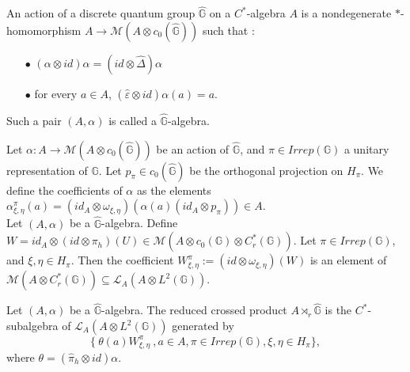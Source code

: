 

\begin{definition} An action of a discrete quantum group $\hat{\mathbb G}$ on a $C^*$-algebra $A$ is a nondegenerate $*$-homomorphism $A\rightarrow \mathcal M(A\otimes c_0(\hat{\mathbb G}))$ such that :
\begin{itemize}
\item[$\bullet$] $(\alpha \otimes id )\alpha = (id\otimes \hat\Delta) \alpha$
\item[$\bullet$] for every $a\in A$, $(\hat\varepsilon \otimes id)\alpha(a) = a$.
\end{itemize}
Such a pair $(A,\alpha)$ is called a $\hat{\mathbb G}$-algebra.
\end{definition}

Let $\alpha : A\rightarrow \mathcal M(A\otimes c_0(\hat{\mathbb G}))$ be an action of $\hat{\mathbb G}$, and $\pi\in Irrep(\mathbb G)$ a unitary representation of $\mathbb G$. Let $p_\pi\in c_0(\hat{\mathbb G}) $ be the orthogonal projection on $H_\pi$. We define the coefficients of $\alpha$ as the elements $\alpha^\pi_{\xi,\eta}(a) = ( id_A \otimes \omega_{\xi,\eta})(\alpha(a)( id _A\otimes p_\pi)) \in A$.\\  

Let $(A,\alpha)$ be a $\hat{\mathbb G}$-algebra. Define $W= id_A \otimes (id\otimes\pi_h)(U) \in \mathcal M (A\otimes c_0(\mathbb G)\otimes C^*_r(\mathbb G))  $. Let $\pi\in Irrep(\mathbb G)$, and $\xi,\eta \in H_\pi$. Then the coefficient $W^\pi_{\xi,\eta}:=(id\otimes \omega_{\xi,\eta})(W)$ is an element of $\mathcal M(A\otimes C_r^*(\mathbb G)) \subseteq \mathcal L_A(A\otimes L^2(\mathbb G))$. 

\begin{definition} Let $(A,\alpha)$ be a $\hat{\mathbb G}$-algebra. The reduced crossed product $A\rtimes_r \hat{\mathbb G}$ is the $C^*$-subalgebra of $\mathcal L_A(A\otimes L^2(\mathbb G))$ generated by 
\[\{\ \theta(a)W^\pi_{\xi,\eta}\ , a\in A , \pi\in Irrep(\mathbb G),\xi,\eta\in H_\pi\},\]
where $\theta = (\hat\pi_h \otimes id)\alpha$.  
\end{definition}


